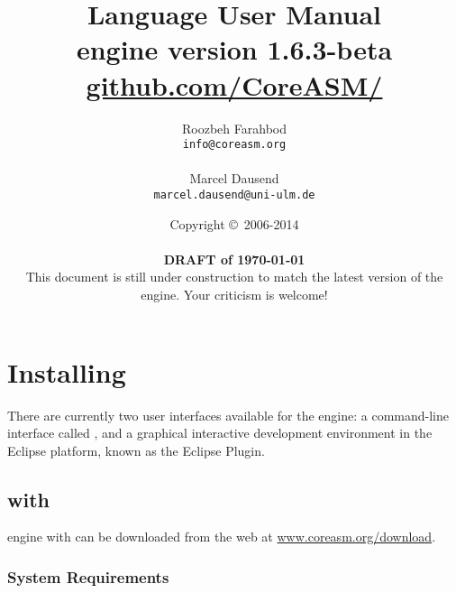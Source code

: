\documentclass{article}
\newcommand{\version}{1.6.3-beta}
\newcommand{\copyrightNotice}[1]{{Copyright \copyright\ #1}}
\renewcommand{\url}[1]{\href{http://#1}{{\ttfamily #1}}}
\begin{document}
\title{\huge \CoreASM Language User Manual \\ {\Large engine version \version} \\ {\large \url{github.com/CoreASM/}}}

\author{Roozbeh Farahbod \\ \texttt{info@coreasm.org}\\\\Marcel Dausend \\ \texttt{marcel.dausend@uni-ulm.de}}  

\date{\copyrightNotice{2006-2014} \\~\\ {\bf DRAFT of \today} \\ {This document is still under construction to match the latest version of the engine. Your criticism is welcome!}}

 \maketitle

\newpage
\tableofcontents
\newpage

\PScommands

\section{Installing \CoreASM}

There are currently two user interfaces available for the \CoreASM engine: a
command-line interface called \Carma, and a graphical interactive
development environment in the Eclipse platform, known as the \CoreASM Eclipse
Plugin.


\subsection{\CoreASM with \Carma}

\CoreASM engine with \Carma can be downloaded from the web at \url{www.coreasm.org/download}.


\subsubsection{System Requirements}
\end{document}
